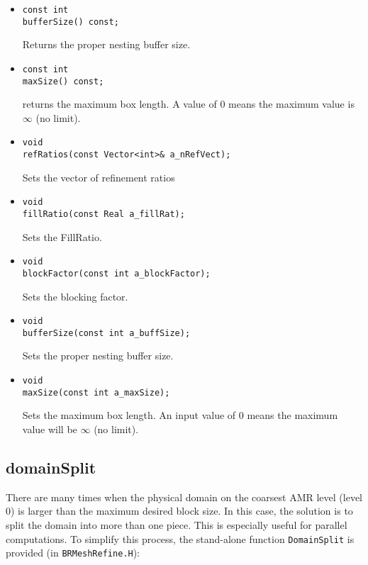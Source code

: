 \begin{itemize}
\item
\begin{verbatim}
const int
bufferSize() const;
\end{verbatim}
Returns the proper nesting buffer size.

\item
\begin{verbatim}
const int
maxSize() const;
\end{verbatim}
returns the maximum box length.  A value of 0 means the maximum value
is $\infty$ (no limit).	   


\item 
\begin{verbatim}
void
refRatios(const Vector<int>& a_nRefVect);
\end{verbatim}
Sets the vector of refinement ratios

\item 
\begin{verbatim}
void
fillRatio(const Real a_fillRat);
\end{verbatim}
Sets the FillRatio.

\item
\begin{verbatim}
void
blockFactor(const int a_blockFactor);
\end{verbatim}
Sets the blocking factor.
 
\item
\begin{verbatim}
void
bufferSize(const int a_buffSize);
\end{verbatim}
Sets the proper nesting buffer size.

\item
\begin{verbatim}
void
maxSize(const int a_maxSize);
\end{verbatim}
Sets the maximum box length.  An input value of 0 means the maximum value
will be $\infty$ (no limit). 

\end{itemize}




\subsection{domainSplit}
There are many times when the physical domain on the coarsest AMR
level (level 0) is  larger than the maximum desired block size. In
this case, the solution is to split the domain into more than one
piece.  This is especially useful for parallel computations.  To
simplify this process, the stand-alone function { \tt DomainSplit} is
provided (in {\tt{BRMeshRefine.H}}):


